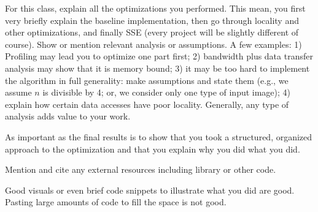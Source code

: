

For this class, explain all the optimizations you performed. This mean, you first very briefly
explain the baseline implementation, then go through locality and other optimizations, and finally SSE (every project will be slightly different of course). Show or mention relevant analysis or assumptions. A few examples: 1) Profiling may lead you to optimize one part first; 2) bandwidth plus data transfer analysis may show that it is memory bound; 3) it may be too hard to implement the algorithm in full generality: make assumptions and state them (e.g., we assume $n$ is divisible by 4; or, we consider only one type of input image); 4) explain how certain data accesses have poor locality. Generally, any type of analysis adds value to your work.

As important as the final results is to show that you took a structured, organized approach to the optimization and that you explain why you did what you did.

Mention and cite any external resources including library or other code.

Good visuals or even brief code snippets to illustrate what you did are good. Pasting large amounts of code to fill the space is not good.